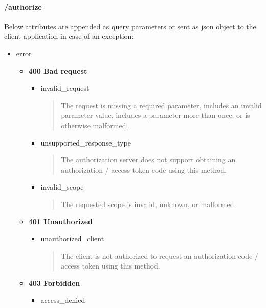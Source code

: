 \documentclass[letterpaper,10pt,english]{sphinxmanual}
\begin{document}
\paragraph{/authorize}
\label{features/oauth2/error_responses:authorize}
Below attributes are appended as query parameters or sent as json object to the client application in case of an exception:
\begin{itemize}
\item {} 
error
\begin{itemize}
\item {} 
\textbf{400 Bad request}
\begin{itemize}
\item {} 
invalid\_request
\begin{quote}

The request is missing a required parameter, includes an invalid parameter value, includes a parameter more than once,
or is otherwise malformed.
\end{quote}

\item {} 
unsupported\_response\_type
\begin{quote}

The authorization server does not support obtaining an authorization / access token code using this method.
\end{quote}

\item {} 
invalid\_scope
\begin{quote}

The requested scope is invalid, unknown, or malformed.
\end{quote}

\end{itemize}

\item {} 
\textbf{401 Unauthorized}
\begin{itemize}
\item {} 
unauthorized\_client
\begin{quote}

The client is not authorized to request an authorization code / access token using this method.
\end{quote}

\end{itemize}

\item {} 
\textbf{403 Forbidden}
\begin{itemize}
\item {} 
access\_denied
\begin{quote}


\end{quote}
\end{itemize}
\end{itemize}
\end{itemize}
\end{document}
